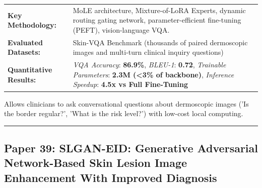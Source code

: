 \documentclass[10pt,a4paper]{article}
\begin{document}
\vspace{4pt}
\begin{tabularx}{\linewidth}{p{3.2cm}X}
\toprule
\textbf{Key Methodology:} & MoLE architecture, Mixture-of-LoRA Experts, dynamic routing gating network, parameter-efficient fine-tuning (PEFT), vision-language VQA. \\
\textbf{Evaluated Datasets:} & Skin-VQA Benchmark (thousands of paired dermoscopic images and multi-turn clinical inquiry questions) \\
\textbf{Quantitative Results:} & \textit{VQA Accuracy}: \textbf{86.9\%}, \textit{BLEU-1}: \textbf{0.72}, \textit{Trainable Parameters}: \textbf{2.3M (<3\% of backbone)}, \textit{Inference Speedup}: \textbf{4.5x vs Full Fine-Tuning} \\
\bottomrule
\end{tabularx}
\vspace{4pt}
\begin{tcolorbox}[utilitybox,title=Clinical Utility and Real-World Impact]
Allows clinicians to ask conversational questions about dermoscopic images ('Is the border regular?', 'What is the risk level?') with low-cost local computing.
\end{tcolorbox}
\vspace{12pt}
\hrule
\vspace{12pt}
\subsection*{Paper 39: SLGAN-EID: Generative Adversarial Network-Based Skin Lesion Image Enhancement With Improved Diagnosis}
\end{document}

